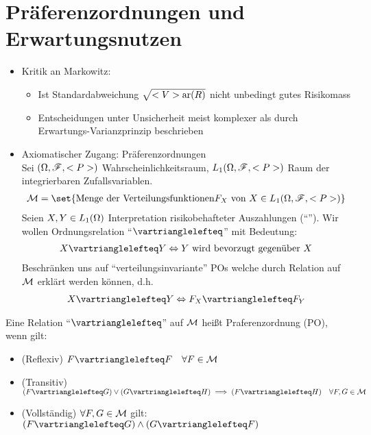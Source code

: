 \section{Präferenzordnungen und Erwartungsnutzen}
\begin{itemize}
	\item Kritik an Markowitz:
	\begin{itemize}
		\item Ist Standardabweichung $\sqrt{<V>\text{ar}(R)}$ nicht unbedingt gutes Risikomass
		\item Entscheidungen unter Unsicherheit meist komplexer als durch Erwartungs-Varianzprinzip beschrieben
	\end{itemize}
	\item Axiomatischer Zugang: Präferenzordnungen\\
	Sei $(\Omega,\mathscr F,<P>)$ Wahrscheinlichkeitsraum, $L_1(\Omega,\mathscr F,<P>)$ Raum der integrierbaren Zufallsvariablen.
	\begin{align*}
		\MM = \set{\text{Menge der Verteilungsfunktionen} F_X \text{ von } X \in L_1(\O,\F,\P)}
	\end{align*}
	Seien $X,Y \in L_1(\Omega)$ Interpretation risikobehafteter Auszahlungen (``''). Wir wollen Ordnungsrelation ``$\vartrianglelefteq$'' mit Bedeutung:
	\begin{align*}
		X \vartrianglelefteq Y \Leftrightarrow Y \text{ wird bevorzugt gegenüber }X
	\end{align*}
	Beschränken uns auf ``verteilungsinvariante'' POs welche durch Relation auf $\mathcal M$ erklärt werden können, d.h.
	\begin{align*}
		X \vartrianglelefteq Y \Leftrightarrow F_X \vartrianglelefteq F_Y
	\end{align*}
\end{itemize}
\begin{definition}
	Eine Relation ``$\vartrianglelefteq$'' auf $\mathcal M$ heißt Praferenzordnung (PO), wenn gilt:
	\begin{itemize}
		\item (Reflexiv) $F \vartrianglelefteq F\quad \forall F \in \MM$
		\item (Transitiv) $(F \vartrianglelefteq G)\vee (G \vartrianglelefteq H) \implies (F \vartrianglelefteq H)\quad \forall F,G \in \MM$
		\item (Vollständig) $\forall F,G \in \mathcal M$ gilt: $(F\vartrianglelefteq G)\wedge (G \vartrianglelefteq F)$
	\end{itemize}
\end{definition}
